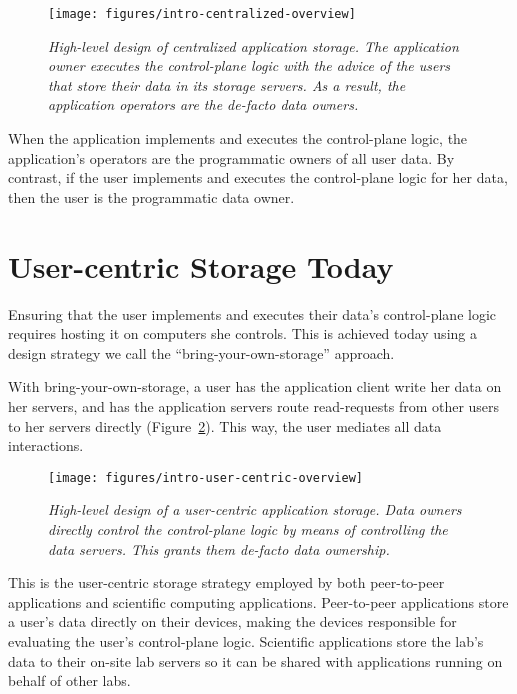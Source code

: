 \begin{figure}[ht!]
   \centering
   \texttt{[image: figures/intro-centralized-overview]}
   \caption{\it High-level design of centralized application storage.
   The application owner executes the control-plane logic with the advice of the
   users that store their data in its storage servers.  As a result, the
   application operators are the de-facto data owners.}
   \label{fig:intro-centralized-overview}
\end{figure}

When the application implements and executes the control-plane logic, the application's
operators are the programmatic owners of all user data.  By contrast, if the user
implements and executes the control-plane logic for her data, then the user
is the programmatic data owner.

\section{User-centric Storage Today}

Ensuring that the user implements and executes their data's control-plane
logic requires hosting it on computers she controls.  This is achieved today
using a design strategy we call the ``bring-your-own-storage'' approach.

With bring-your-own-storage, a user has
the application client write her data on her servers, and has the application
servers route read-requests from other users to her servers directly
(Figure~\ref{fig:intro-user-centric-overview}).  This way, the user mediates all
data interactions.


\begin{figure}[ht!]
   \centering
   \texttt{[image: figures/intro-user-centric-overview]}
   \caption{\it High-level design of a user-centric application storage.
   Data owners directly control the control-plane logic by means of controlling
   the data servers.  This grants them de-facto data ownership.}
   \label{fig:intro-user-centric-overview}
\end{figure}

This is the user-centric storage strategy employed by both peer-to-peer applications and 
scientific computing applications.  Peer-to-peer applications store a user's
data directly on their devices, making the devices responsible for evaluating
the user's control-plane logic.  Scientific applications store the lab's
data to their on-site lab servers so it can be shared with applications running
on behalf of other labs.

